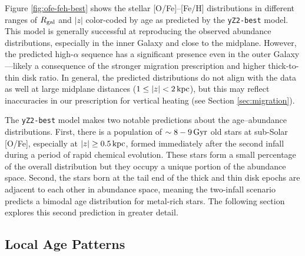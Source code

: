 \documentclass[twocolumn,twocolappendix,linenumbers]{aastex631}
\newcommand{\kpc}{\,{\rm kpc}}
\newcommand{\Gyr}{\,{\rm Gyr}}
\begin{document}
Figure \ref{fig:ofe-feh-best} shows the stellar [O/Fe]--[Fe/H] distributions in different ranges of $R_{\rm gal}$ and $|z|$ color-coded by age as predicted by the {\tt yZ2-best} model. This model is generally successful at reproducing the observed abundance distributions, especially in the inner Galaxy and close to the midplane. However, the predicted high-$\alpha$ sequence has a significant presence even in the outer Galaxy---likely a consequence of the stronger migration prescription and higher thick-to-thin disk ratio. In general, the predicted distributions do not align with the data as well at large midplane distances ($1\leq|z|<2\kpc$), but this may reflect inaccuracies in our prescription for vertical heating (see Section \ref{sec:migration}).

The {\tt yZ2-best} model makes two notable predictions about the age--abundance distributions. First, there is a population of $\sim8-9\Gyr$ old stars at sub-Solar [O/Fe], especially at $|z|\ge0.5\kpc$, formed immediately after the second infall during a period of rapid chemical evolution. These stars form a small percentage of the overall distribution \citep[see also Figure 11 from][]{spitoni_remind_2024} but they occupy a unique portion of the abundance space. 
Second, the stars born at the tail end of the thick and thin disk epochs are adjacent to each other in abundance space, meaning the two-infall scenario predicts a bimodal age distribution for metal-rich stars. The following section explores this second prediction in greater detail.

\subsection{Local Age Patterns}
\end{document}
